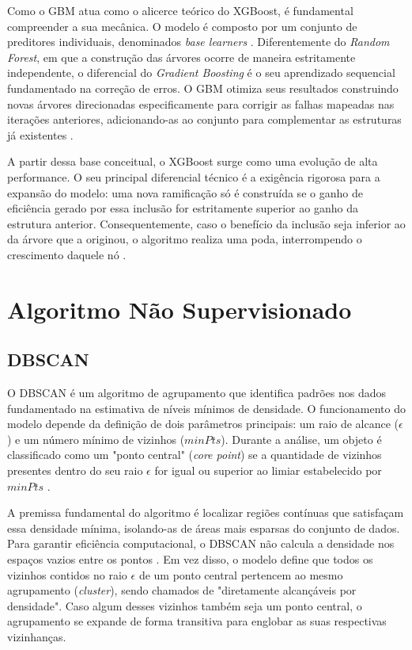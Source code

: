 \documentclass{uflamon}          %
\begin{document}
Como o GBM atua como o alicerce teórico do XGBoost, é fundamental compreender a sua mecânica. O modelo é composto por um conjunto de preditores individuais, denominados \textit{base learners} \cite{wade2020}. Diferentemente do \textit{Random Forest}, em que a construção das árvores ocorre de maneira estritamente independente, o diferencial do \textit{Gradient Boosting} é o seu aprendizado sequencial fundamentado na correção de erros. O GBM otimiza seus resultados construindo novas árvores direcionadas especificamente para corrigir as falhas mapeadas nas iterações anteriores, adicionando-as ao conjunto para complementar as estruturas já existentes \cite{wade2020, pan2018}.

A partir dessa base conceitual, o XGBoost surge como uma evolução de alta performance. O seu principal diferencial técnico é a exigência rigorosa para a expansão do modelo: uma nova ramificação só é construída se o ganho de eficiência gerado por essa inclusão for estritamente superior ao ganho da estrutura anterior. Consequentemente, caso o benefício da inclusão seja inferior ao da árvore que a originou, o algoritmo realiza uma poda, interrompendo o crescimento daquele nó \cite{chen2016}.

\section{Algoritmo Não Supervisionado}

\subsection{DBSCAN}

O DBSCAN é um algoritmo de agrupamento que identifica padrões nos dados fundamentado na estimativa de níveis mínimos de densidade. O funcionamento do modelo depende da definição de dois parâmetros principais: um raio de alcance ($\epsilon$) e um número mínimo de vizinhos ($minPts$). Durante a análise, um objeto é classificado como um "ponto central" (\textit{core point}) se a quantidade de vizinhos presentes dentro do seu raio $\epsilon$ for igual ou superior ao limiar estabelecido por $minPts$ \cite{schubert2017}.

A premissa fundamental do algoritmo é localizar regiões contínuas que satisfaçam essa densidade mínima, isolando-as de áreas mais esparsas do conjunto de dados. Para garantir eficiência computacional, o DBSCAN não calcula a densidade nos espaços vazios entre os pontos \cite{schubert2017}. Em vez disso, o modelo define que todos os vizinhos contidos no raio $\epsilon$ de um ponto central pertencem ao mesmo agrupamento (\textit{cluster}), sendo chamados de "diretamente alcançáveis por densidade". Caso algum desses vizinhos também seja um ponto central, o agrupamento se expande de forma transitiva para englobar as suas respectivas vizinhanças.
\end{document}
